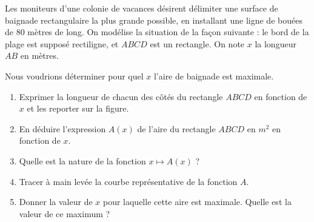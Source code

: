 
\begin{exercice}\label{exosmath-0087}

    \begin{multicols}{2}
Les moniteurs d'une colonie de vacances désirent délimiter une surface de baignade rectangulaire la plus grande possible, en installant une ligne de bouées de $80$ mètres de long. On modélise la situation de la façon suivante : le bord de la plage est supposé rectiligne, et $ABCD$ est un rectangle. On note $x$ la longueur $AB$ en mètres.

Nous voudrions déterminer pour quel \( x\) l'aire de baignade est maximale.

    \columnbreak



    \end{multicols}

\begin{enumerate}
\item Exprimer la longueur de chacun des côtés du rectangle $ABCD$ en
  fonction de $x$ et les reporter sur la figure.
\item En déduire l'expression $A(x)$ de l'aire du rectangle
  $ABCD$ en $m^2$ en fonction de $x$.
\item Quelle est la nature de la fonction $x\mapsto A(x)$ ?
\item Tracer à main levée la courbe représentative de la fonction $A$.
\item Donner la valeur de $x$ pour laquelle cette aire est maximale. Quelle est la valeur de ce maximum ? 
\end{enumerate}

\end{exercice}
